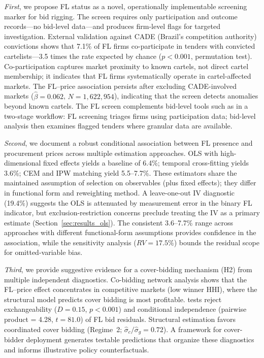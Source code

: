 \emph{First}, we propose FL status as a novel, operationally
implementable screening marker for bid rigging. The screen requires
only participation and outcome records---no bid-level data---and
produces firm-level flags for targeted investigation. External
validation against CADE (Brazil's competition authority) convictions
shows that 7.1\% of FL firms co-participate in tenders with convicted
cartelists---3.5 times the rate expected by chance ($p < 0.001$,
permutation test). Co-participation captures market proximity to known
cartels, not direct cartel membership; it indicates that FL firms
systematically operate in cartel-affected markets. The FL--price
association persists after excluding CADE-involved markets
($\hat{\beta} = 0.062$, $N = 1{,}622{,}954$), indicating that the
screen detects anomalies beyond known cartels. The FL screen
complements bid-level tools such as \citet{imhof2019detecting} in a
two-stage workflow: FL screening triages firms using participation
data; bid-level analysis then examines flagged tenders where
granular data are available.

\emph{Second}, we document a robust conditional association between FL
presence and procurement prices across multiple estimation approaches.
OLS with high-dimensional fixed effects yields a baseline of 6.4\%;
temporal cross-fitting yields 3.6\%; CEM and IPW matching yield
5.5--7.7\%. These estimators share the maintained assumption of
selection on observables (plus fixed effects); they differ in
functional form and reweighting method. A leave-one-out IV
diagnostic (19.4\%) suggests the OLS is attenuated by
measurement error in the binary FL indicator, but exclusion-restriction
concerns preclude treating the IV as a primary estimate
(Section~\ref{sec:results_ols}). The consistent 3.6--7.7\% range
across approaches with different functional-form assumptions provides
confidence in the association, while the sensitivity analysis
($RV = 17.5\%$) bounds the residual scope for omitted-variable
bias.

\emph{Third}, we provide suggestive evidence for a cover-bidding
mechanism (H2) from multiple independent diagnostics. Co-bidding
network analysis shows that the FL--price effect concentrates in
competitive markets (low winner HHI), where the structural model
predicts cover bidding is most profitable. \cites{bajari2003deciding}
tests reject exchangeability ($D = 0.15$, $p < 0.001$) and
conditional independence (pairwise product = 4.28, $t = 81.0$) of
FL bid residuals. Structural estimation favors coordinated cover
bidding (Regime~2; $\hat{\sigma}_c / \hat{\sigma}_g = 0.72$). A
framework for cover-bidder deployment generates testable predictions
that organize these diagnostics and informs illustrative policy
counterfactuals.

